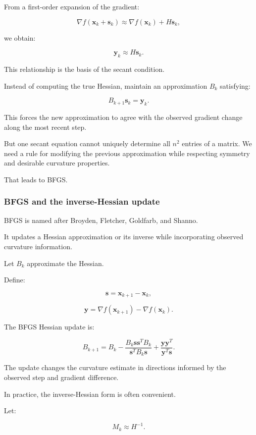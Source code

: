 From a first-order expansion of the gradient:

\[
\nabla f(\mathbf x_k+\mathbf s_k) \approx \nabla f(\mathbf x_k)+H\mathbf s_k,
\]

we obtain:

\[
\boxed{ \mathbf y_k\approx H\mathbf s_k }.
\]

This relationship is the basis of the secant condition.

Instead of computing the true Hessian, maintain an approximation \(B_k\) satisfying:

\[
\boxed{ B_{k+1}\mathbf s_k=\mathbf y_k }.
\]

This forces the new approximation to agree with the observed gradient change along the most recent step.

But one secant equation cannot uniquely determine all \(n^2\) entries of a matrix. We need a rule for modifying the previous approximation while respecting symmetry and desirable curvature properties.

That leads to BFGS.

\subsubsection{BFGS and the inverse-Hessian update}\label{02-foundations-ii-ch026-bfgs-and-the-inverse-hessian-update}

BFGS is named after Broyden, Fletcher, Goldfarb, and Shanno.

It updates a Hessian approximation or its inverse while incorporating observed curvature information.

Let \(B_k\) approximate the Hessian.

Define:

\[
\mathbf s=\mathbf x_{k+1}-\mathbf x_k,
\]

\[
\mathbf y=\nabla f(\mathbf x_{k+1})-\nabla f(\mathbf x_k).
\]

The BFGS Hessian update is:

\[
\boxed{ B_{k+1} = B_k - \frac{B_k\mathbf s\mathbf s^TB_k} {\mathbf s^TB_k\mathbf s} + \frac{\mathbf y\mathbf y^T} {\mathbf y^T\mathbf s} }.
\]

The update changes the curvature estimate in directions informed by the observed step and gradient difference.

In practice, the inverse-Hessian form is often convenient.

Let:

\[
M_k\approx H^{-1}.
\]

